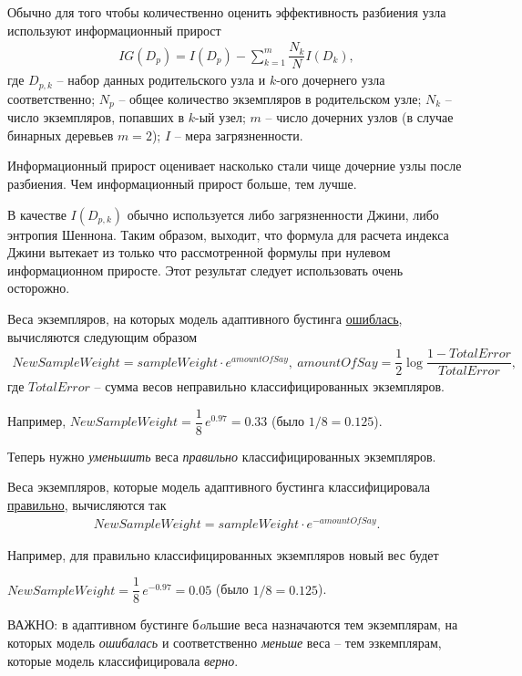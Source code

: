 \documentclass[%
	11pt,
	a4paper,
	utf8,
		]{article}
\begin{document}
Обычно для того чтобы количественно оценить эффективность разбиения узла используют информационный прирост
\begin{align*}
	IG(D_p) = I(D_p) - \sum_{k=1}^{m} \dfrac{N_k}{N} I(D_k),
\end{align*}
где $ D_{p,k} $ -- набор данных родительского узла и $ k $-ого дочернего узла соответственно; $ N_p $ -- общее количество экземпляров в родительском узле; $ N_k $ -- число экземпляров, попавших в $ k $-ый узел; $ m $ -- число дочерних узлов (в случае бинарных деревьев $ m = 2 $); $ I $ -- мера загрязненности.

Информационный прирост оценивает насколько стали чище дочерние узлы после разбиения. Чем информационный прирост больше, тем лучше.

В качестве $ I(D_{p,k}) $ обычно используется либо загрязненности Джини, либо энтропия Шеннона. Таким образом, выходит, что формула для расчета индекса Джини вытекает из только что рассмотренной формулы при нулевом информационном приросте. {\color{red} Этот результат следует использовать очень осторожно}.

Веса экземпляров, на которых модель адаптивного бустинга \underline{ошиблась}, вычисляются следующим образом
\begin{align*}
	NewSampleWeight = sampleWeight \cdot e^{amountOfSay}, \ amountOfSay = \dfrac{1}{2} \log \dfrac{ 1 - TotalError }{TotalError},
\end{align*}
где $ TotalError $ -- сумма весов неправильно классифицированных экземпляров.

Например, $ NewSampleWeight = \dfrac{1}{8}\, e^{0.97} = 0.33 $ (было $ 1/8 = 0.125 $).

Теперь нужно \emph{уменьшить} веса \emph{правильно} классифицированных экземпляров.

Веса экземпляров, которые модель адаптивного бустинга классифицировала \underline{правильно}, вычисляются так
\begin{align*}
	NewSampleWeight = sampleWeight \cdot e^{-amountOfSay}.
\end{align*}

Например, для правильно классифицированных экземпляров новый вес будет

$ NewSampleWeight = \dfrac{1}{8} \, e^{-0.97} = 0.05 $ (было $ 1/8 = 0.125 $).

ВАЖНО: в адаптивном бустинге б\emph{o}льшие веса назначаются тем экземплярам, на которых модель \emph{ошибалась} и соответственно \emph{меньше} веса -- тем эзкемплярам, которые модель классифицировала \emph{верно}.
\end{document}
